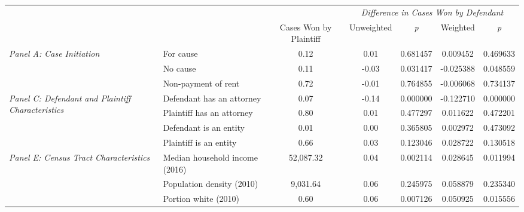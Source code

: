 \begin{tabular}{llccccc}
\toprule
 &  & \textit{} & \multicolumn{4}{|c|}{\textit{Difference in Cases Won by Defendant}} \\
 &  & Cases Won by Plaintiff & Unweighted & \emph{p} & Weighted & \emph{p} \\
\midrule
\multirow[c]{3}{3cm}{\textit{Panel A: Case Initiation}} & For cause & 0.12 & 0.01 & 0.681457 & 0.009452 & 0.469633 \\
 & No cause & 0.11 & -0.03 & 0.031417 & -0.025388 & 0.048559 \\
 & Non-payment of rent & 0.72 & -0.01 & 0.764855 & -0.006068 & 0.734137 \\
\cline{1-7}
\multirow[c]{4}{3cm}{\textit{Panel C: Defendant and Plaintiff Characteristics}} & Defendant has an attorney & 0.07 & -0.14 & 0.000000 & -0.122710 & 0.000000 \\
 & Plaintiff has an attorney & 0.80 & 0.01 & 0.477297 & 0.011622 & 0.472201 \\
 & Defendant is an entity & 0.01 & 0.00 & 0.365805 & 0.002972 & 0.473092 \\
 & Plaintiff is an entity & 0.66 & 0.03 & 0.123046 & 0.028722 & 0.130518 \\
\cline{1-7}
\multirow[c]{3}{3cm}{\textit{Panel E: Census Tract Characteristics}} & Median household income (2016) & 52,087.32 & 0.04 & 0.002114 & 0.028645 & 0.011994 \\
 & Population density (2010) & 9,031.64 & 0.06 & 0.245975 & 0.058879 & 0.235340 \\
 & Portion white (2010) & 0.60 & 0.06 & 0.007126 & 0.050925 & 0.015556 \\
\cline{1-7}
\bottomrule
\end{tabular}
